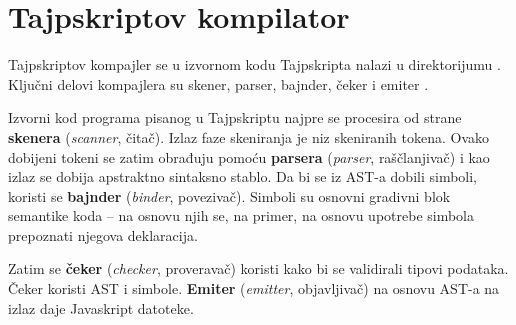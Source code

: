 \section{Tajpskriptov kompilator}

Tajpskriptov kompajler se u izvornom kodu Tajpskripta \cite{gh:ms:ts} nalazi u direktorijumu .
Ključni delovi kompajlera su skener, parser, bajnder, čeker i emiter \cite{typescript-deep-dive}.

Izvorni kod programa pisanog u Tajpskriptu najpre se procesira od strane \textbf{skenera} (\textsl{scanner}, čitač).
Izlaz faze skeniranja je niz skeniranih tokena.
Ovako dobijeni tokeni se zatim obrađuju pomoću \textbf{parsera} (\textsl{parser}, raščlanjivač) i kao izlaz se dobija apstraktno sintaksno stablo.
Da bi se iz AST-a dobili simboli, koristi se \textbf{bajnder} (\textsl{binder}, povezivač).
Simboli su osnovni gradivni blok semantike koda -- na osnovu njih se, na primer, na osnovu upotrebe simbola prepoznati njegova deklaracija.

Zatim se \textbf{čeker} (\textsl{checker}, proveravač) koristi kako bi se validirali tipovi podataka.
Čeker koristi AST i simbole.
\textbf{Emiter} (\textsl{emitter}, objavljivač) na osnovu AST-a na izlaz daje Javaskript datoteke.

\begin{center}
\end{center}
